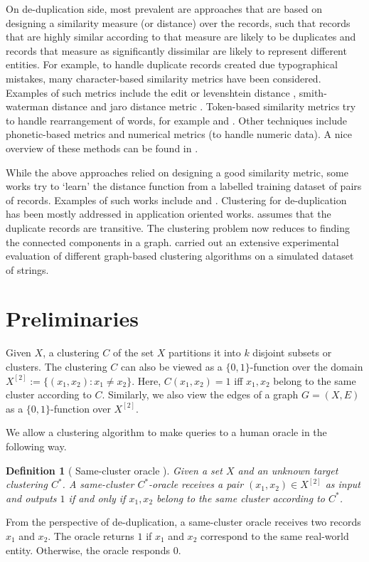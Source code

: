 \documentclass[12pt]{article}
\newtheorem{definition}[theorem]{Definition}
\begin{document}
On de-duplication side, most prevalent are approaches that are based on designing a similarity measure (or distance) over the records, such that records that are highly similar according to that measure are likely to be duplicates and records that measure as significantly dissimilar are likely to represent different entities. For example, to handle duplicate records created due typographical mistakes, many character-based similarity metrics have been considered. Examples of such metrics include the edit or levenshtein distance \cite{levenshtein1966binary}, smith-waterman distance \cite{waterman1981identification} and jaro distance metric \cite{jaro1980unimatch}. Token-based similarity metrics try to handle rearrangement of words, for example \cite{monge1996field} and \cite{cohen1998integration}. Other techniques include phonetic-based metrics and numerical metrics (to handle numeric data). A nice overview of these methods can be found in \cite{elmagarmid2007duplicate}. 
   
While the above approaches relied on designing a good similarity metric, some works try to `learn' the distance function from a labelled training dataset of pairs of records. Examples of such works include \cite{cochinwala2001efficient} and \cite{bilenko2003adaptive}. Clustering for de-duplication has been mostly addressed in application oriented works. \cite{hernandez1995merge} assumes that the duplicate records are transitive. The clustering problem now reduces to finding the connected components in a graph. \cite{hassanzadeh2009framework} carried out an extensive experimental evaluation of different graph-based clustering algorithms on a simulated dataset of strings.

\section{Preliminaries}
\label{section:problemFormulation}
Given $X$, a clustering $C$ of the set $X$ partitions it into $k$ disjoint subsets or clusters. The clustering $C$ can also be viewed as a $\{0, 1\}$-function over the domain $X^{[2]} := \{(x_1, x_2) : x_1 \neq x_2\}$. Here, $C(x_1, x_2) = 1$ iff $x_1, x_2$ belong to the same cluster according to $C$. Similarly, we also view the edges of a graph $G = (X, E)$ as a $\{0, 1\}$-function over $X^{[2]}$.

We allow a clustering algorithm to make queries to a human oracle in the following way. 
\begin{definition}[ Same-cluster oracle \cite{ashtiani2016clustering}]
Given a set $X$ and an unknown target clustering $C^*$. A same-cluster $C^*$-oracle receives a pair $(x_1, x_2) \in X^{[2]}$ as input and outputs $1$ if and only if $x_1, x_2$ belong to the same cluster according to $C^*$. 
\end{definition}
From the perspective of de-duplication, a same-cluster oracle receives two records $x_1$ and $x_2$. The oracle returns $1$ if $x_1$ and $x_2$ correspond to the same real-world entity. Otherwise, the oracle responds $0$.
\end{document}
